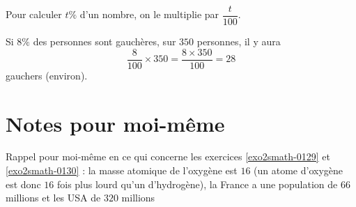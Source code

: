 \begin{Aretenir}
    Pour calculer \( t\%\) d'un nombre, on le multiplie par \( \dfrac{ t }{ 100 }\).
\end{Aretenir}

\begin{example}
    Si \( 8\%\) des personnes sont gauchères, sur \( 350\) personnes, il y aura
    \begin{equation}
        \frac{ 8 }{ 100 }\times 350=\frac{ 8\times 350 }{ 100 }=28
    \end{equation}
    gauchers (environ).
\end{example}


\section{Notes pour moi-même}

Rappel pour moi-même en ce qui concerne les exercices \ref{exo2smath-0129} et \ref{exo2smath-0130} : la masse atomique de l'oxygène est \( 16\) (un atome d'oxygène est donc \( 16\) fois plus lourd qu'un d'hydrogène), la France a une population de \( 66\) millions et les USA de \( 320\) millions


